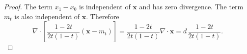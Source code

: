 \documentclass[10pt,a4paper]{amsart}
\newcommand{\diver}{\nabla\!\cdot}
\newcommand{\vx}{\bm{x}}
\begin{document}
\begin{proof}
The term $x_1-x_0$ is independent of $\vx$ and has zero divergence. The term $m_t$ is also independent of $\vx$. Therefore
\begin{equation}
  \diver \left[\frac{1-2t}{2t(1-t)}(\vx-m_t)\right]
  =
  \frac{1-2t}{2t(1-t)}\diver \vx
  =
  d\,\frac{1-2t}{2t(1-t)}.
\end{equation}
\end{proof}
\end{document}
